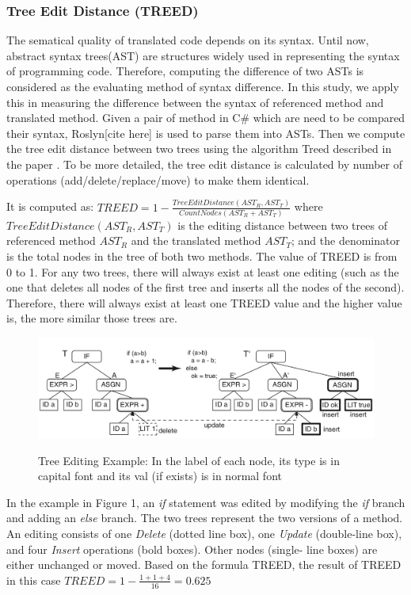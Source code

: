 \subsubsection{\textbf{Tree Edit Distance (TREED)}}  
The sematical quality of translated code depends on its syntax. Until now, abstract syntax trees(AST) are structures widely used in  representing the syntax of programming code. Therefore, computing the difference of two ASTs is considered as the evaluating method of syntax difference.
In this study, we apply this in measuring the difference between the syntax of referenced method and translated method. Given a pair of method in C\# which are need to be compared their syntax, Roslyn[cite here] is used to parse them into ASTs. Then we compute the tree edit distance between two trees using the algorithm Treed described in the paper \cite{algorithm}.
To be more detailed, the tree edit distance is calculated by number of operations (add/delete/replace/move) to make them identical. 

It is computed as:  $TREED = 1 -  \frac{TreeEditDistance\left(AST_R, AST_T\right)}{CountNodes \left(AST_R+AST_T\right)}$ where $TreeEditDistance\left(AST_R, AST_T\right)$ is the editing distance between two trees of referenced method $AST_R$ and the translated method $AST_T$; and the denominator is the total nodes in the tree of both two methods. The value of TREED is from 0 to 1. For any two trees, there will always exist at least one editing (such as the one that deletes all nodes of the first tree and inserts all the nodes of the second). Therefore, there will always exist at least one TREED value and the higher value is, the more similar those trees are.

\begin{figure}[h]
	\caption{Tree Editing Example: In the label of each node, its type is in capital font and its val (if exists) is in normal font}
	\includegraphics[scale=0.3]{img/treed.png}
	\centering
	\label{fig:treed}
\end{figure}

In the example in Figure 1, an \textit{if} statement was edited by modifying the \textit{if} branch and adding an \textit{else} branch. The two trees represent the two versions of a method. An editing consists of one \textit{Delete} (dotted line box), one \textit{Update} (double-line box), and four \textit{Insert} operations (bold boxes). Other nodes (single- line boxes) are either unchanged or moved. Based on the formula TREED, the result of TREED in this case  $TREED = 1 - \frac{1 + 1 + 4}{16}=0.625$



